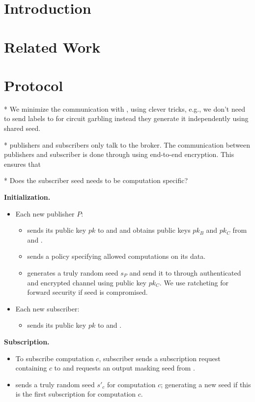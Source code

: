 \section{Introduction}

\section{Related Work}

\section{Protocol}

* We minimize the communication with \garbler, using clever tricks, e.g.,
we don't need to send labels to \garbler for circuit garbling instead they
generate it independently using shared seed.

* publishers and subscribers only talk to the broker. The communication
between publishers and subscriber is done through \broker using end-to-end
encryption. This ensures that 

* Does the subscriber seed needs to be computation specific?

\noindent\textbf{Initialization.}
\begin{itemize}[leftmargin=*]
 
  \item Each new publisher $P$: 
		\begin{itemize}
			\item sends its public key $pk$ to \broker and \garbler and obtains
		  public keys $pk_B$ and $pk_C$ from \broker and \garbler.
			\item sends a policy specifying allowed computations on its data.
			\item generates a truly random seed $s_P$ and send it to \garbler
		  through authenticated and encrypted channel using \garbler public
		  key $pk_C$. We use ratcheting for forward security if seed is
		  compromised.
		\end{itemize} 

	\item Each new subscriber:
		\begin{itemize}
			 \item sends its public key $pk$ to \broker and \garbler.
		\end{itemize}

\end{itemize}

\noindent\textbf{Subscription.}
\begin{itemize}[leftmargin=*]

	\item To subscribe computation $c$, subscriber sends a subscription request
	  containing $c$ to \broker and requests an output masking seed from
	  \garbler.  
	\item \garbler sends a truly random seed $s'_c$ for computation $c$;
	  generating a new seed if this is the first subscription for computation
	  $c$. 
\end{itemize}

